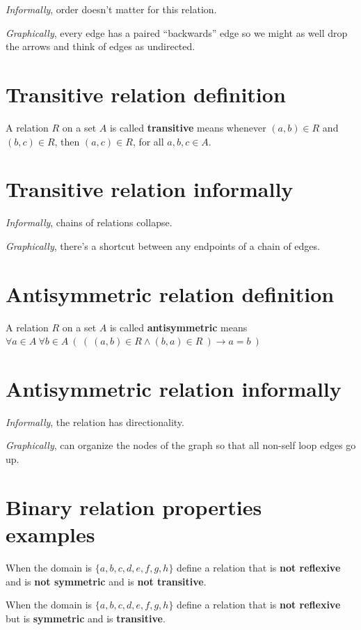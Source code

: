 \documentclass[12pt, oneside]{article}
\begin{document}
{\it Informally}, order doesn't matter for this relation.

{\it Graphically}, every edge has a paired ``backwards'' edge so we might
as well drop the arrows and think of edges as undirected. \vfill
\section*{Transitive relation definition}


A relation $R$ on a set $A$ is called {\bf transitive} means 
whenever $(a, b) \in R$ and $(b, c) \in R$, then $(a, c) \in R$, for all $a, b, c \in A$.
 \vfill
\section*{Transitive relation informally}


{\it Informally}, chains of relations collapse.

{\it Graphically}, there's a shortcut between any endpoints of a chain of 
edges. \vfill
\section*{Antisymmetric relation definition}


A relation $R$ on a set $A$ is called {\bf antisymmetric} means 
$\forall a \in A ~\forall b \in A~\left(~\left( ~(a,b) \in R \land (b,a) \in R ~\right) \to a=b~\right)$
 \vfill
\section*{Antisymmetric relation informally}


{\it Informally}, the relation has directionality.

{\it Graphically}, can organize the nodes of the graph so that 
all non-self loop edges go up. \vfill
\section*{Binary relation properties examples}



When the domain is $\{ a,b,c,d,e,f,g,h\}$ define a relation that is {\bf not reflexive} and 
is {\bf not symmetric} and is {\bf not transitive}.

\vspace{80pt}

When the domain is $\{ a,b,c,d,e,f,g,h\}$ define a relation that is {\bf not reflexive} but 
is {\bf symmetric} and is {\bf transitive}.
\end{document}

